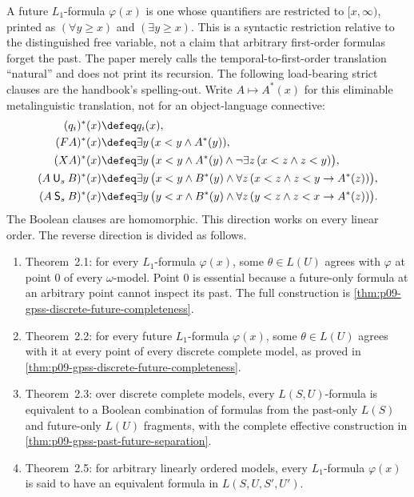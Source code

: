 A future \(L_1\)-formula \(\varphi(x)\) is one whose quantifiers are restricted
to \([x,\infty)\), printed as \((\forall y\ge x)\) and
\((\exists y\ge x)\).  This is a syntactic restriction relative to the
distinguished free variable, not a claim that arbitrary first-order formulas
forget the past.  The paper merely calls the temporal-to-first-order
translation ``natural'' and does not print its recursion.  The following
load-bearing strict clauses are the handbook's spelling-out.  Write
\(A\mapsto A^*(x)\) for this eliminable metalinguistic translation, not for an
object-language connective:
\[
\begin{aligned}
 (q_i)^*(x)
   &\defeq q_i(x),\\
 (FA)^*(x)
   &\defeq \exists y\,(x<y\land A^*(y)),\\
 (XA)^*(x)
   &\defeq \exists y\,
      \bigl(x<y\land A^*(y)\land
        \neg\exists z\,(x<z\land z<y)\bigr),\\
 (A\mathbin{\mathsf U_s}B)^*(x)
   &\defeq \exists y\,
       \bigl(x<y\land B^*(y)\land
         \forall z\,(x<z\land z<y\to A^*(z))\bigr),\\
 (A\mathbin{\mathsf S_s}B)^*(x)
   &\defeq \exists y\,
       \bigl(y<x\land B^*(y)\land
         \forall z\,(y<z\land z<x\to A^*(z))\bigr).
\end{aligned}
\]
The Boolean clauses are homomorphic.
This direction works on every linear order.  The reverse direction is divided
as follows.

\begin{enumerate}
\item Theorem~2.1: for every \(L_1\)-formula \(\varphi(x)\), some
  \(\theta\in L(U)\) agrees with \(\varphi\) at point \(0\) of every
  \(\omega\)-model.  Point \(0\) is essential because a future-only formula at
  an arbitrary point cannot inspect its past. The full construction is
  \cref{thm:p09-gpss-discrete-future-completeness}.
\item Theorem~2.2: for every future \(L_1\)-formula \(\varphi(x)\), some
  \(\theta\in L(U)\) agrees with it at every point of every discrete complete
  model, as proved in \cref{thm:p09-gpss-discrete-future-completeness}.
\item Theorem~2.3: over discrete complete models, every \(L(S,U)\)-formula is
  equivalent to a Boolean combination of formulas from the past-only
  \(L(S)\) and future-only \(L(U)\) fragments, with the complete
  effective construction in \cref{thm:p09-gpss-past-future-separation}.
\item Theorem~2.5: for arbitrary linearly ordered models, every
  \(L_1\)-formula \(\varphi(x)\) is said to have an equivalent formula in
  \(L(S,U,S',U')\).
\end{enumerate}

